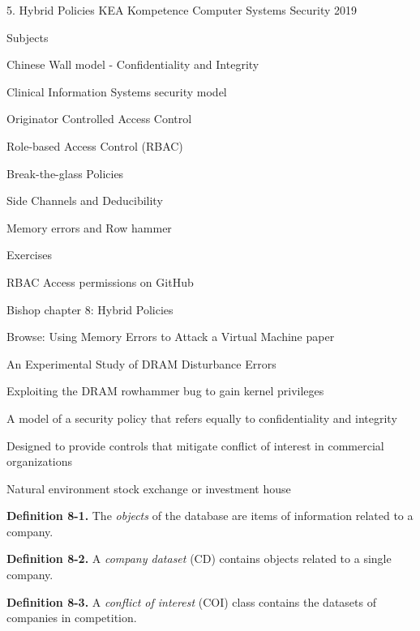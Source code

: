\documentclass[Screen16to9,17pt]{foils}
\begin{document}
\mytitlepage
{5. Hybrid Policies}
{KEA Kompetence Computer Systems Security 2019}



\begin{list1}
\item Subjects
\begin{list2}
\item Chinese Wall model - Confidentiality and Integrity
\item Clinical Information Systems security model
\item Originator Controlled Access Control
\item Role-based Access Control (RBAC)
\item Break-the-glass Policies
\item Side Channels and Deducibility
\item Memory errors and Row hammer
\end{list2}
\item Exercises
\begin{list2}
\item RBAC Access permissions on GitHub
\end{list2}
\end{list1}




\begin{list1}
\item Bishop chapter 8: Hybrid Policies
\item Browse: Using Memory Errors to Attack a Virtual Machine paper
\item An Experimental Study of DRAM Disturbance Errors
\item Exploiting the DRAM rowhammer bug to gain kernel privileges
\item {}
\end{list1}




\begin{list1}
\item A model of a security policy that refers equally to confidentiality and integrity
\item Designed to provide controls that mitigate conflict of interest in commercial organizations
\item Natural environment stock exchange or investment house
\item {\bf Definition 8-1.} The \emph{objects} of the database are items of information related to a company.
\item {\bf Definition 8-2.} A \emph{company dataset} (CD) contains objects related to a single company.
\item {\bf Definition 8-3.} A \emph{conflict of interest} (COI) class contains the datasets of companies in competition.
\item
\item
\end{list1}
\end{document}
